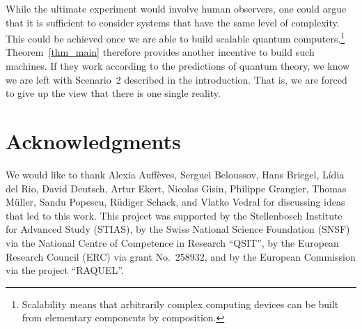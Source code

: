 \documentclass[12pt]{article}
\theoremstyle{plain}
\theoremstyle{definition}
\begin{document}
While the ultimate experiment would involve human observers, one could argue that it is sufficient to consider systems that have the same   level of complexity.  This could be achieved  once we are able to build scalable quantum computers.\footnote{Scalability means that arbitrarily complex computing devices can be built from elementary components by composition.}  Theorem~\ref{thm_main} therefore provides another incentive to build such machines. If they  work according to the predictions of quantum theory, we know we are left with Scenario~2 described in the introduction. That is, we are forced to give up the view that there is one single reality. 


\section*{Acknowledgments}

We would like to thank Alexia Auff\`eves, Serguei Beloussov, Hans Briegel, L\'idia del Rio, David Deutsch, Artur Ekert,  Nicolas Gisin, Philippe Grangier, Thomas M\"uller, Sandu Popescu, R\"udiger Schack, and Vlatko Vedral for discussing ideas that led to this work. This project was supported by the Stellenbosch Institute for Advanced Study (STIAS), by the Swiss National Science Foundation (SNSF) via the National Centre of Competence in Research ``QSIT'', by the European Research Council (ERC) via grant No.\ 258932,  and by the European Commission via the project ``RAQUEL''.  
\end{document}
